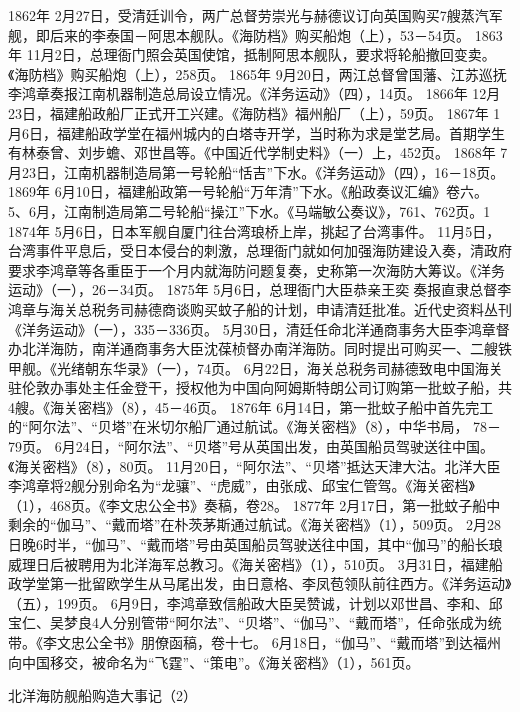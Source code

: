 \documentclass[12pt,UTF8]{ctexbook}
\begin{document}
1862年
2月27日，受清廷训令，两广总督劳崇光与赫德议订向英国购买7艘蒸汽军舰，即后来的李泰国－阿思本舰队。《海防档》购买船炮（上），53－54页。
1863年
11月2日，总理衙门照会英国使馆，抵制阿思本舰队，要求将轮船撤回变卖。《海防档》购买船炮（上），258页。
1865年
9月20日，两江总督曾国藩、江苏巡抚李鸿章奏报江南机器制造总局设立情况。《洋务运动》（四），14页。
1866年
12月23日，福建船政船厂正式开工兴建。《海防档》福州船厂（上），59页。
1867年
1月6日，福建船政学堂在福州城内的白塔寺开学，当时称为求是堂艺局。首期学生有林泰曾、刘步蟾、邓世昌等。《中国近代学制史料》（一）上，452页。
1868年
7月23日，江南机器制造局第一号轮船“恬吉”下水。《洋务运动》（四），16－18页。
1869年
6月10日，福建船政第一号轮船“万年清”下水。《船政奏议汇编》卷六。
5、6月，江南制造局第二号轮船“操江”下水。《马端敏公奏议》，761、762页。1
1874年
5月6日，日本军舰自厦门往台湾琅桥上岸，挑起了台湾事件。
11月5日，台湾事件平息后，受日本侵台的刺激，总理衙门就如何加强海防建设入奏，清政府要求李鸿章等各重臣于一个月内就海防问题复奏，史称第一次海防大筹议。《洋务运动》（一），26－34页。
1875年
5月6日，总理衙门大臣恭亲王奕奏报直隶总督李鸿章与海关总税务司赫德商谈购买蚊子船的计划，申请清廷批准。近代史资料丛刊《洋务运动》（一），335－336页。
5月30日，清廷任命北洋通商事务大臣李鸿章督办北洋海防，南洋通商事务大臣沈葆桢督办南洋海防。同时提出可购买一、二艘铁甲舰。《光绪朝东华录》（一），74页。
6月22日，海关总税务司赫德致电中国海关驻伦敦办事处主任金登干，授权他为中国向阿姆斯特朗公司订购第一批蚊子船，共4艘。《海关密档》（8），45－46页。
1876年
6月14日，第一批蚊子船中首先完工的“阿尔法”、“贝塔”在米切尔船厂通过航试。《海关密档》（8），中华书局， 78－79页。
6月24日，“阿尔法”、“贝塔”号从英国出发，由英国船员驾驶送往中国。《海关密档》（8），80页。
11月20日，“阿尔法”、“贝塔”抵达天津大沽。北洋大臣李鸿章将2舰分别命名为“龙骧”、“虎威”，由张成、邱宝仁管驾。《海关密档》（1），468页。《李文忠公全书》奏稿，卷28。
1877年
2月17日，第一批蚊子船中剩余的“伽马”、“戴而塔”在朴茨茅斯通过航试。《海关密档》（1），509页。
2月28日晚6时半，“伽马”、“戴而塔”号由英国船员驾驶送往中国，其中“伽马”的船长琅威理日后被聘用为北洋海军总教习。《海关密档》（1），510页。
3月31日，福建船政学堂第一批留欧学生从马尾出发，由日意格、李凤苞领队前往西方。《洋务运动》（五），199页。
6月9日，李鸿章致信船政大臣吴赞诚，计划以邓世昌、李和、邱宝仁、吴梦良4人分别管带“阿尔法”、“贝塔”、“伽马”、“戴而塔”，任命张成为统带。《李文忠公全书》朋僚函稿，卷十七。
6月18日，“伽马”、“戴而塔”到达福州向中国移交，被命名为“飞霆”、“策电”。《海关密档》（1），561页。




北洋海防舰船购造大事记（2）
\end{document}
